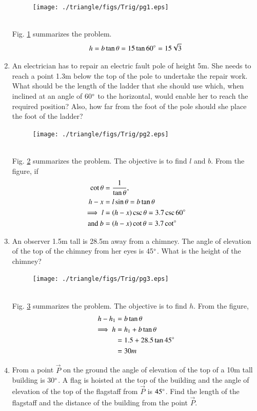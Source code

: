 \begin{enumerate}[label=\arabic*.,ref=\thesubsection.\theenumi]
%
\begin{figure}[!ht]
\texttt{[image: ./triangle/figs/Trig/pg1.eps]}
\caption{}
\label{fig:trig_pg1}
\end{figure}
%
\\
\solution Fig. \ref{fig:trig_pg1} summarizes the problem. 
%
\begin{align}
h = b\tan\theta = 15\tan60\degree = 15\sqrt{3}
\end{align}
%
\item An electrician has to repair an electric fault pole of height 5m.  She needs to reach a point 1.3m below the top of the pole to undertake the repair work.  What should be the length of the ladder that she should use which, when inclined at an angle of 60$\degree$ to the horizontal, would enable her to reach the required position?  Also, how far from the foot of the pole should she place the foot of the ladder?
%
\begin{figure}[!ht]
\texttt{[image: ./triangle/figs/Trig/pg2.eps]}
\caption{}
\label{fig:trig_pg2}
\end{figure}
%
\\
\solution Fig. \ref{fig:trig_pg2} summarizes the problem. The objective is to find $l$ and $b$.  From the figure,
%
if 
\begin{align}
\cot \theta &=\frac{1}{\tan \theta},
\\
h-x &= l\sin \theta = b\tan \theta
\\
\implies l &= \left(h-x\right)\csc \theta = 3.7\csc60\degree 
\\
\text{and } b&=\left(h-x\right)\cot\theta = 3.7 \cot \degree 
\end{align}
\item An observer 1.5m tall is 28.5m away from a chimney.  The angle of elevation of the top of the chimney from her eyes is 45$\degree$.  What is the height of the chimney?
%
%
\begin{figure}[!ht]
\texttt{[image: ./triangle/figs/Trig/pg3.eps]}
\caption{}
\label{fig:trig_pg3}
\end{figure}
%
\\
\solution Fig. \ref{fig:trig_pg3} summarizes the problem. The objective is to find $h$.  From the figure,
%
\begin{align}
h-h_1 &=  b\tan \theta
\\
\implies h &= h_1+b\tan\theta 
\\
&= 1.5+28.5\tan45\degree 
\\
&= 30m
\end{align}
\item From a point $\vec{P}$ on the ground the angle of elevation of the top of a 10m tall building is 30$\degree$.  A flag is hoisted at the top of the building and the angle of elevation of the top of the flagstaff from $\vec{P}$ is $45\degree$.  Find the length of the flagstaff and the distance of the building from the point $\vec{P}$.

\end{enumerate}

